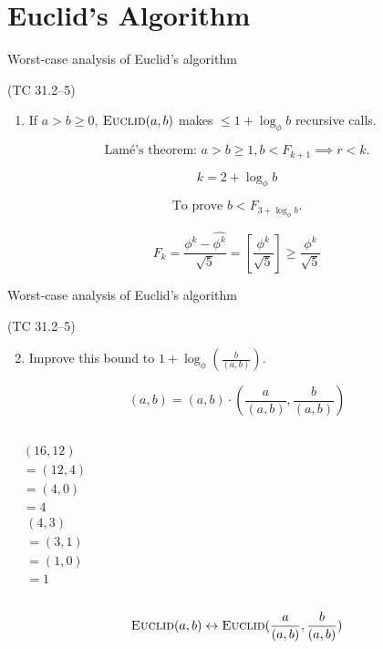 \section{Euclid's Algorithm}

\begin{frame}{Worst-case analysis of Euclid's algorithm}
  \begin{exampleblock}{(TC 31.2--5)}
	\begin{enumerate}
	  \item If $a > b \ge 0$, $\textsc{Euclid}(a,b)$ makes $\le 1 + \log_{\phi}b$ recursive calls.
	\end{enumerate}
  \end{exampleblock}

  \pause
  \[
	\text{Lam\'{e}'s theorem: } a > b \ge 1, b < F_{k+1} \implies r < k.
  \]

  \pause
  \[
	k = 2 + \log_{\phi}b
  \]

  \pause
  \[
	\text{To prove } b < F_{3 + \log_{\phi}b}.
  \]

  \pause
  \[
	F_k = \frac{\phi^{k} - \hat{\phi^{k}}}{\sqrt{5}} = [\frac{\phi^{k}}{\sqrt{5}}] \ge \frac{\phi^{k}}{\sqrt{5}}
  \]
\end{frame}
\begin{frame}{Worst-case analysis of Euclid's algorithm}
  \begin{exampleblock}{(TC 31.2--5)}
	\begin{enumerate}
	  \setcounter{enumi}{1}
	  \item Improve this bound to $1 + \log_{\phi}(\frac{b}{(a,b)})$.
	\end{enumerate}
  \end{exampleblock}

  \pause
  \[
	(a,b) = (a,b) \cdot (\frac{a}{(a,b)}, \frac{b}{(a,b)})
  \]

  \pause
  \vspace{-0.20cm}
  \begin{columns}
	  \begin{align*}
		&(16,12) \\
		&=(12,4) \\
		&=(4,0) \\
		&=4
	  \end{align*}
	  \begin{align*}
		&(4,3) \\
		&=(3,1) \\
		&=(1,0) \\
		&=1
	  \end{align*}
  \end{columns}
  
  \pause
  \[
	\textsc{Euclid}(a,b) \leftrightarrow \textsc{Euclid}(\frac{a}{(a,b)}, \frac{b}{(a,b)})
  \]
\end{frame}
